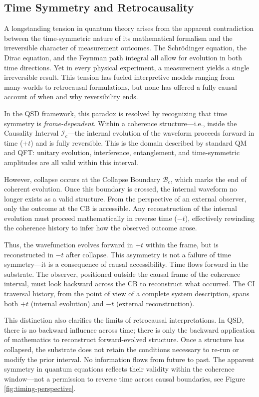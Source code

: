 \documentclass[preprints,article,submit,pdftex,moreauthors]{Definitions/mdpi}
\begin{document}
\subsection{Time Symmetry and Retrocausality}
\label{subsec:timesymmetry}

A longstanding tension in quantum theory arises from the apparent contradiction between the time-symmetric nature of its mathematical formalism and the irreversible character of measurement outcomes. The Schrödinger equation, the Dirac equation, and the Feynman path integral all allow for evolution in both time directions. Yet in every physical experiment, a measurement yields a single irreversible result. This tension has fueled interpretive models ranging from many-worlds to retrocausal formulations, but none has offered a fully causal account of when and why reversibility ends.

In the QSD framework, this paradox is resolved by recognizing that time symmetry is \textit{frame-dependent}. Within a coherence structure—i.e., inside the Causality Interval \( \mathcal{I}_c \)—the internal evolution of the waveform proceeds forward in time (\( +t \)) and is fully reversible. This is the domain described by standard QM and QFT: unitary evolution, interference, entanglement, and time-symmetric amplitudes are all valid within this interval.

However, collapse occurs at the Collapse Boundary \( \mathcal{B}_c \), which marks the end of coherent evolution. Once this boundary is crossed, the internal waveform no longer exists as a valid structure. From the perspective of an external observer, only the outcome at the CB is accessible. Any reconstruction of the internal evolution must proceed mathematically in reverse time (\( -t \)), effectively rewinding the coherence history to infer how the observed outcome arose.

Thus, the wavefunction evolves forward in \( +t \) within the frame, but is reconstructed in \( -t \) after collapse. This asymmetry is not a failure of time symmetry—it is a consequence of causal accessibility. Time flows forward in the substrate. The observer, positioned outside the causal frame of the coherence interval, must look backward across the CB to reconstruct what occurred. The CI traversal history, from the point of view of a complete system description, spans both \( +t \) (internal evolution) and \( -t \) (external reconstruction).

This distinction also clarifies the limits of retrocausal interpretations. In QSD, there is no backward influence across time; there is only the backward application of mathematics to reconstruct forward-evolved structure. Once a structure has collapsed, the substrate does not retain the conditions necessary to re-run or modify the prior interval. No information flows from future to past. The apparent symmetry in quantum equations reflects their validity within the coherence window—not a permission to reverse time across causal boundaries, see Figure \ref{fig:timing-perspective}.
\end{document}
